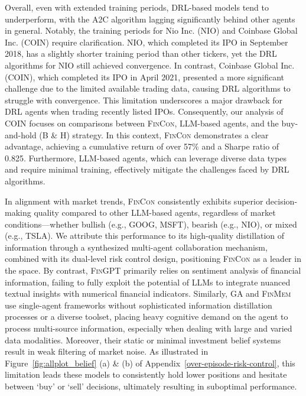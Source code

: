 Overall, even with extended training periods, DRL-based models tend to underperform, with the A2C algorithm lagging significantly behind other agents in general. Notably, the training periods for Nio Inc. (NIO) and Coinbase Global Inc. (COIN) require clarification. NIO, which completed its IPO in September 2018, has a slightly shorter training period than other tickers, yet the DRL algorithms for NIO still achieved convergence. In contrast, Coinbase Global Inc. (COIN), which completed its IPO in April 2021, presented a more significant challenge due to the limited available trading data, causing DRL algorithms to struggle with convergence. This limitation underscores a major drawback for DRL agents when trading recently listed IPOs. Consequently, our analysis of COIN focuses on comparisons between \textsc{FinCon}, LLM-based agents, and the buy-and-hold (B \& H) strategy. In this context, \textsc{FinCon} demonstrates a clear advantage, achieving a cumulative return of over 57\% and a Sharpe ratio of 0.825. Furthermore, LLM-based agents, which can leverage diverse data types and require minimal training, effectively mitigate the challenges faced by DRL algorithms.



In alignment with market trends, \textsc{FinCon} consistently exhibits superior decision-making quality compared to other LLM-based agents, regardless of market conditions—whether bullish (e.g., GOOG, MSFT), bearish (e.g., NIO), or mixed (e.g., TSLA). We attribute this performance to its high-quality distillation of information through a synthesized multi-agent collaboration mechanism, combined with its dual-level risk control design, positioning \textsc{FinCon} as a leader in the space. By contrast, \textsc{FinGPT} primarily relies on sentiment analysis of financial information, failing to fully exploit the potential of LLMs to integrate nuanced textual insights with numerical financial indicators. Similarly, \textsc{GA} and \textsc{FinMem} use single-agent frameworks without sophisticated information distillation processes or a diverse toolset, placing heavy cognitive demand on the agent to process multi-source information, especially when dealing with large and varied data modalities. Moreover, their static or minimal investment belief systems result in weak filtering of market noise. As illustrated in Figure~\ref{fig:allplot_belief} (a) \& (b) of Appendix~\ref{over-episode-risk-control}, this limitation leads these models to consistently hold lower positions and hesitate between `buy' or `sell' decisions, ultimately resulting in suboptimal performance.

